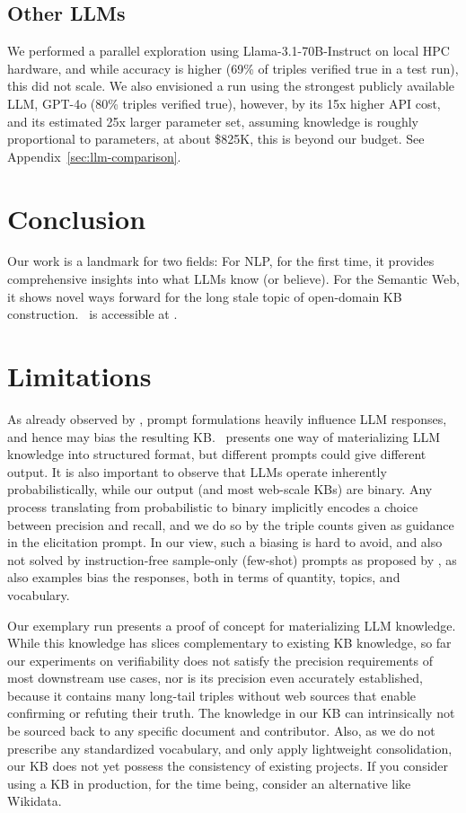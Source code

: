 \section{Other LLMs}
We performed a parallel exploration using Llama-3.1-70B-Instruct on local HPC hardware, and while accuracy is higher (69\% of triples verified true in a test run), this did not scale. We also envisioned a run using the strongest publicly available LLM, GPT-4o (80\% triples verified true), however, by its 15x higher API cost, and its estimated 25x larger parameter set, assuming knowledge is roughly proportional to parameters, at about \$825K, this is beyond our budget. See Appendix~\ref{sec:llm-comparison}.


\chapter{Conclusion}


Our work is a landmark for two fields: For NLP, for the first time, it provides comprehensive insights into what LLMs know (or believe). For the Semantic Web, it shows novel ways forward for the long stale topic of open-domain KB construction. \ourkb\ is accessible at \website.


\chapter{Limitations}
\label{sec:limitations}


As already observed by \citet{petroni-etal-2019-language}, prompt formulations heavily influence LLM responses, and hence may bias the resulting KB. \ourkb\ presents one way of materializing LLM knowledge into structured format, but different prompts could give different output. It is also important to observe that LLMs operate inherently probabilistically, while our output (and most web-scale KBs) are binary. Any process translating from probabilistic to binary implicitly encodes a choice between precision and recall, and we do so by the triple counts given as guidance in the elicitation prompt. 
In our view, such a biasing is hard to avoid, and also not solved by instruction-free sample-only (few-shot) prompts as proposed by \citet{wu2024towards}, as also examples bias the responses, both in terms of quantity, topics, and vocabulary.

Our exemplary run presents a proof of concept for materializing LLM knowledge. While this knowledge has slices complementary to existing KB knowledge, so far our experiments on verifiability does not satisfy the precision requirements of most downstream use cases, nor is its precision even accurately established, because it contains many long-tail triples without web sources that enable confirming or refuting their truth. The knowledge in our KB can intrinsically not be sourced back to any specific document and contributor. Also, as we do not prescribe any standardized vocabulary, and only apply lightweight consolidation, our KB does not yet possess the consistency of existing projects.
If you consider using a KB in production, for the time being, consider an alternative like Wikidata.


